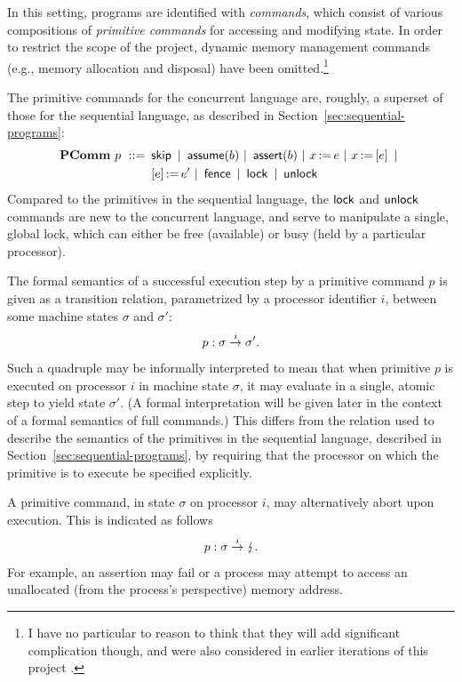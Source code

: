 \documentclass[11pt]{report}
\begin{document}
In this setting, programs are identified with \emph{commands}, which consist of various compositions of \emph{primitive commands} for accessing and modifying state. In order to restrict the scope of the project, dynamic memory management commands (e.g., memory allocation and disposal) have been omitted.\footnote{I have no particular to reason to think that they will add significant complication though, and were also considered in earlier iterations of this project \cite{wmsldetails,lola11}.}

The primitive commands for the concurrent language are, roughly, a superset of those for the sequential language, as described in Section~\ref{sec:sequential-programs}: \begin{align*} \mathbf{PComm}~p ~::=~ & \operatorname{\mathsf{skip}} ~|~ \operatorname{\mathsf{assume}}(b) ~|~ \operatorname{\mathsf{assert}}(b) ~|~ x \operatorname{:\!=} e ~|~ x \operatorname{:\!=} \left[ e \right] ~|~ \\ 
	& \left[ e \right] \operatorname{:\!=} e' ~|~ \operatorname{\mathsf{fence}} ~|~ \operatorname{\mathsf{lock}} ~|~ \operatorname{\mathsf{unlock}} 	
\end{align*} Compared to the primitives in the sequential language, the $\operatorname{\mathsf{lock}}$ and $\operatorname{\mathsf{unlock}}$ commands are new to the concurrent language, and serve to manipulate a single, global lock, which can either be free (available) or busy (held by a particular processor). 

The formal semantics of a successful execution step by a primitive command $p$ is given as a transition relation, parametrized by a processor identifier $i$, between some machine states $\sigma$ and $\sigma'$: \[ p : \sigma \stackrel{i}{\rightarrow} \sigma'. \] Such a quadruple may be informally interpreted to mean that when primitive $p$ is executed on processor $i$ in machine state $\sigma$, it may evaluate in a single, atomic step to yield state $\sigma'$. (A formal interpretation will be given later in the context of a formal semantics of full commands.) This differs from the relation used to describe the semantics of the primitives in the sequential language, described in Section~\ref{sec:sequential-programs}, by requiring that the processor on which the primitive is to execute be specified explicitly. 

A primitive command, in state $\sigma$ on processor $i$, may alternatively abort upon execution. This is indicated as follows \[ p : \sigma \stackrel{i}{\rightarrow} \lightning. \] For example, an assertion may fail or a process may attempt to access an unallocated (from the process's perspective) memory address. 
\end{document}
